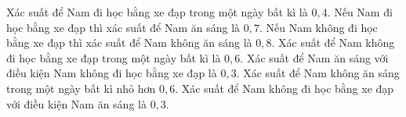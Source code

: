 \begin{ex}
Xác suất để Nam đi học bằng xe đạp trong một ngày bất kì là $0{,}4$. Nếu Nam đi học bằng xe đạp thì xác suất để Nam ăn sáng là $0{,}7$. Nếu Nam không đi học bằng xe đạp thì xác suất để Nam không ăn sáng là $0{,}8$.
\choiceTF
{\True Xác suất để Nam không đi học bằng xe đạp trong một ngày bất kì là $0{,}6$.}
{Xác suất để Nam ăn sáng với điều kiện Nam không đi học bằng xe đạp là $0{,}3$.}
{Xác suất để Nam không ăn sáng trong một ngày bất kì nhỏ hơn $0{,}6$.}
{\True Xác suất để Nam không đi học bằng xe đạp với điều kiện Nam ăn sáng là $0{,}3$.}
\end{ex}
